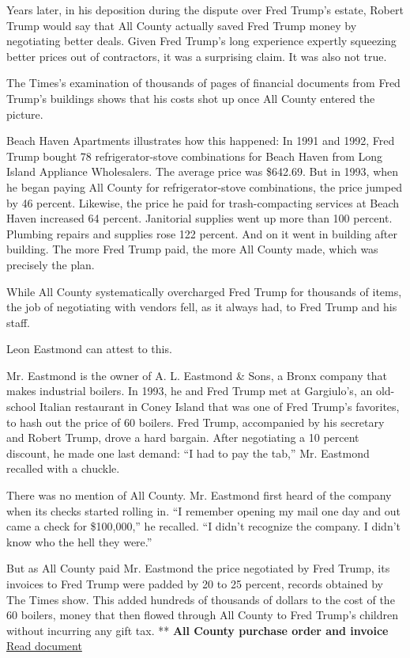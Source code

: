 Years later, in his deposition during the dispute over Fred Trump's
estate, Robert Trump would say that All County actually saved Fred Trump
money by negotiating better deals. Given Fred Trump's long experience
expertly squeezing better prices out of contractors, it was a surprising
claim. It was also not true.

The Times's examination of thousands of pages of financial documents
from Fred Trump's buildings shows that his costs shot up once All County
entered the picture.

Beach Haven Apartments illustrates how this happened: In 1991 and 1992,
Fred Trump bought 78 refrigerator-stove combinations for Beach Haven
from Long Island Appliance Wholesalers. The average price was \$642.69.
But in 1993, when he began paying All County for refrigerator-stove
combinations, the price jumped by 46 percent. Likewise, the price he
paid for trash-compacting services at Beach Haven increased 64 percent.
Janitorial supplies went up more than 100 percent. Plumbing repairs and
supplies rose 122 percent. And on it went in building after building.
The more Fred Trump paid, the more All County made, which was precisely
the plan.

While All County systematically overcharged Fred Trump for thousands of
items, the job of negotiating with vendors fell, as it always had, to
Fred Trump and his staff.

Leon Eastmond can attest to this.

Mr. Eastmond is the owner of A. L. Eastmond \& Sons, a Bronx company
that makes industrial boilers. In 1993, he and Fred Trump met at
Gargiulo's, an old-school Italian restaurant in Coney Island that was
one of Fred Trump's favorites, to hash out the price of 60 boilers. Fred
Trump, accompanied by his secretary and Robert Trump, drove a hard
bargain. After negotiating a 10 percent discount, he made one last
demand: ``I had to pay the tab,'' Mr. Eastmond recalled with a chuckle.

There was no mention of All County. Mr. Eastmond first heard of the
company when its checks started rolling in. ``I remember opening my mail
one day and out came a check for \$100,000,'' he recalled. ``I didn't
recognize the company. I didn't know who the hell they were.''

But as All County paid Mr. Eastmond the price negotiated by Fred Trump,
its invoices to Fred Trump were padded by 20 to 25 percent, records
obtained by The Times show. This added hundreds of thousands of dollars
to the cost of the 60 boilers, money that then flowed through All County
to Fred Trump's children without incurring any gift tax. ** \textbf{All
County purchase order and invoice}
\href{https://int.nyt.com/data/documenthelper/336-all-county-invoice/12e771601b10479cbd9c/optimized/full.pdf\#page=1}{Read
document}

